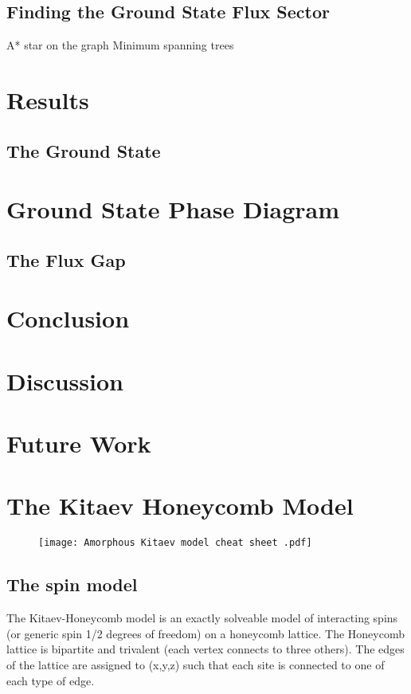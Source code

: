 		\subsection{Finding the Ground State Flux Sector}
            A* star on the graph
		    Minimum spanning trees
    
\section{Results}
    \subsection{The Ground State}
	\section{Ground State Phase Diagram}
	\subsection{The Flux Gap}
	
		
\section{Conclusion}
\section{Discussion}
\section{Future Work}

\section{The Kitaev Honeycomb Model}
\begin{figure}
 \centering 
 \texttt{[image: Amorphous Kitaev model cheat sheet .pdf]}
\end{figure}
\subsection{The spin model}
The Kitaev-Honeycomb model is an exactly solveable model of interacting spins (or generic spin 1/2 degrees of freedom) on a honeycomb lattice. The Honeycomb lattice is bipartite and trivalent (each vertex connects to three others). The edges of the lattice are assigned to (x,y,z) such that each site is connected to one of each type of edge. 

